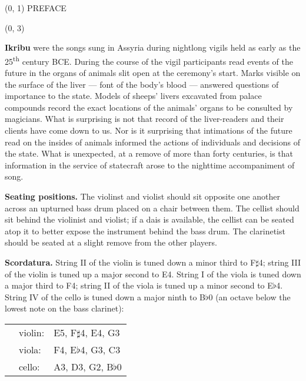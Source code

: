 \documentclass[10pt]{article}
\begin{document}
\begin{textblock}{23}(0, 1)
\center \huge PREFACE
\end{textblock}

\begin{textblock}{23}(0, 3)

\textbf{Ikribu} were the songs sung in Assyria during nightlong vigils held as
early as the 25\textsuperscript{th} century BCE. During the course of the vigil
participants read events of the future in the organs of animals slit open at
the ceremony's start. Marks visible on the surface of the liver --- font of the
body's blood --- answered questions of importance to the state. Models of
sheeps' livers excavated from palace compounds record the exact locations of
the animals' organs to be consulted by magicians. What is surprising is not
that record of the liver-readers and their clients have come down to us. Nor is
it surprising that intimations of the future read on the insides of animals
informed the actions of individuals and decisions of the state. What is
unexpected, at a remove of more than forty centuries, is that information in
the service of statecraft arose to the nighttime accompaniment of song.

\textbf{Seating positions.} The violinst and violist should sit opposite one
another across an upturned bass drum placed on a chair between them. The
cellist should sit behind the violinist and violist; if a dais is available,
the cellist can be seated atop it to better expose the instrument behind the
bass drum. The clarinetist should be seated at a slight remove from the other
players.

\textbf{Scordatura.} String II of the violin is tuned down a minor third to
F$\sharp$4; string III of the violin is tuned up a major second to E4. String I
of the viola is tuned down a major third to F4; string II of the viola is tuned
up a minor second to E$\flat$4. String IV of the cello is tuned down a major
ninth to B$\flat$0 (an octave below the lowest note on the bass clarinet):

\begin{tabu}{l l l}
\phantom{M} & violin: & E5, F$\sharp$4, E4, G3 \\
            & viola: & F4, E$\flat$4, G3, C3 \\
            & cello: & A3, D3, G2, B$\flat$0 \\
\end{tabu}


\end{textblock}
\end{document}
